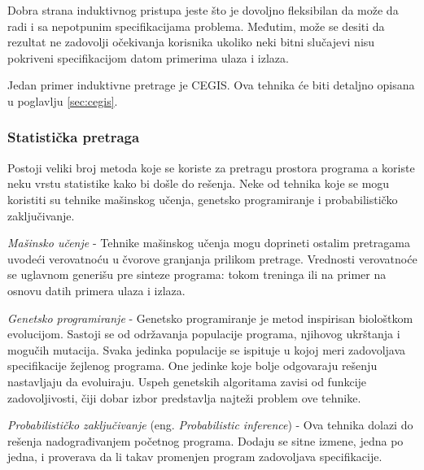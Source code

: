 Dobra strana induktivnog pristupa jeste što je dovoljno fleksibilan da može da radi i sa nepotpunim specifikacijama problema. Međutim, može se desiti da rezultat ne zadovolji očekivanja korisnika ukoliko neki bitni slučajevi nisu pokriveni specifikacijom datom primerima ulaza i izlaza.

Jedan primer induktivne pretrage je CEGIS. Ova tehnika će biti detaljno opisana u poglavlju \ref{sec:cegis}.


\subsubsection{Statistička pretraga}
\label{subsubsec:Statistical}

Postoji veliki broj metoda koje se koriste za pretragu prostora programa a koriste neku vrstu statistike kako bi došle do rešenja. Neke od tehnika koje se mogu koristiti su tehnike mašinskog učenja, genetsko programiranje i probabilističko zaključivanje.

\emph{Mašinsko učenje} - Tehnike mašinskog učenja mogu doprineti ostalim pretragama uvodeći verovatnoću u čvorove granjanja prilikom pretrage. Vrednosti verovatnoće se uglavnom generišu pre sinteze programa: tokom treninga ili na primer na osnovu datih primera ulaza i izlaza.

\emph{Genetsko programiranje} - Genetsko programiranje je metod inspirisan biološtkom evolucijom. Sastoji se od održavanja populacije programa, njihovog ukrštanja i mogučih mutacija. Svaka jedinka populacije se ispituje u kojoj meri zadovoljava specifikacije žejlenog programa. One jedinke koje bolje odgovaraju rešenju nastavljaju da evoluiraju. Uspeh genetskih algoritama zavisi od funkcije zadovoljivosti, čiji dobar izbor predstavlja najteži problem ove tehnike.

\emph{Probabilističko zaključivanje} (eng. \emph{Probabilistic inference}) - Ova tehnika dolazi do rešenja nadograđivanjem početnog programa. Dodaju se sitne izmene, jedna po jedna, i proverava da li takav promenjen program zadovoljava specifikacije.
